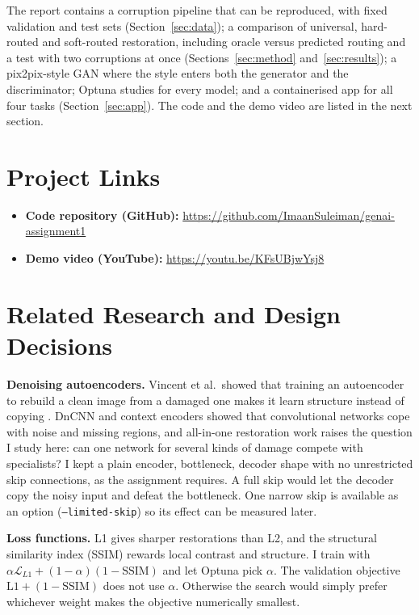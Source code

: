 \documentclass[conference]{IEEEtran}
\let\oldsection\section
\renewcommand{\section}[1]{\oldsection{\textbf{#1}}}
\begin{document}
The report contains a corruption pipeline that can be reproduced, with fixed validation and test sets (Section~\ref{sec:data}); a comparison of universal, hard-routed and soft-routed restoration, including oracle versus predicted routing and a test with two corruptions at once (Sections~\ref{sec:method} and~\ref{sec:results}); a pix2pix-style GAN where the style enters both the generator and the discriminator; Optuna studies for every model; and a containerised app for all four tasks (Section~\ref{sec:app}). The code and the demo video are listed in the next section.

\section{Project Links}
\begin{itemize}
\item \textbf{Code repository (GitHub):} \url{https://github.com/ImaanSuleiman/genai-assignment1}
\item \textbf{Demo video (YouTube):} \url{https://youtu.be/KFsUBjwYsj8}
\end{itemize}

\section{Related Research and Design Decisions}\label{sec:related}
\textbf{Denoising autoencoders.} Vincent et al.\ showed that training an autoencoder to rebuild a clean image from a damaged one makes it learn structure instead of copying \cite{vincent2008}. DnCNN \cite{zhang2017dncnn} and context encoders \cite{pathak2016} showed that convolutional networks cope with noise and missing regions, and all-in-one restoration work \cite{li2022airnet} raises the question I study here: can one network for several kinds of damage compete with specialists? I kept a plain encoder, bottleneck, decoder shape with no unrestricted skip connections, as the assignment requires. A full skip would let the decoder copy the noisy input and defeat the bottleneck. One narrow skip is available as an option (\texttt{--limited-skip}) so its effect can be measured later.

\textbf{Loss functions.} L1 gives sharper restorations than L2, and the structural similarity index (SSIM) \cite{wang2004ssim} rewards local contrast and structure. I train with $\alpha\mathcal{L}_{L1}+(1-\alpha)(1-\mathrm{SSIM})$ and let Optuna pick $\alpha$. The validation objective $\mathrm{L1}+(1-\mathrm{SSIM})$ does not use $\alpha$. Otherwise the search would simply prefer whichever weight makes the objective numerically smallest.
\end{document}
